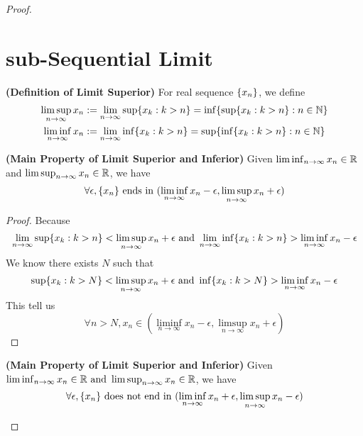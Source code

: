 \documentclass{report}
\begin{document}
\begin{proof}
\section{sub-Sequential Limit}
\begin{definition}
\label{2.3.1}
\textbf{(Definition of Limit Superior)} For real sequence $\{ x_n \}$, we define
\begin{align}
  \limsup_{n\to\infty} x_n&:=\lim_{n\to\infty} \sup \{ x_k:k>n \}=\inf \{ \sup \{ x_k:k>n \}:n\in\mathbb{N} \}\\
  \liminf_{n\to\infty} x_n&:=\lim_{n\to\infty}\inf \{ x_k:k>n \}=\sup \{ \inf \{ x_k:k>n \}:n\in\mathbb{N} \}
\end{align}
\end{definition}
\begin{theorem}
\label{2.3.2}
\textbf{(Main Property of Limit Superior and Inferior)} 
Given $\liminf_{n\to\infty} x_n\in\mathbb{R}$ and $\limsup_{n\to\infty} x_n\in\mathbb{R}$, we have
\begin{gather}
\forall \epsilon ,\{ x_n \}\text{ ends in }(\liminf_{n\to\infty} x_n-\epsilon ,\limsup_{n\to\infty} x_n+\epsilon )
\end{gather}
\end{theorem}
\begin{proof}
Because 
\begin{equation}
\lim_{n\to\infty}\sup  \{ x_k:k>n \}<\limsup_{n\to\infty} x_n+\epsilon \text{ and }\lim_{n\to\infty}\inf \{ x_k:k>n \}>\liminf_{n\to\infty} x_n-\epsilon 
\end{equation}
We know there exists $N$ such that 
 \begin{equation}
\sup \{ x_k:k>N \}<\limsup_{n\to\infty} x_n+\epsilon \text{ and }\inf \{ x_k:k>N \}>\liminf_{n\to\infty} x_n-\epsilon 
\end{equation}
This tell us
\begin{equation}
\forall n>N, x_n\in (\liminf_{n\to\infty} x_n-\epsilon ,\limsup_{n\to\infty} x_n+\epsilon )
\end{equation}
\end{proof}
\begin{theorem}
\label{2.3.3}
\textbf{(Main Property of Limit Superior and Inferior)} 
Given $\liminf_{n\to\infty} x_n\in\mathbb{R}\text{ and }\limsup_{n\to\infty} x_n\in\mathbb{R}$, we have
\begin{equation}
\forall \epsilon , \set{x_n}\text{ does not end in }(\liminf_{n\to\infty} x_n+\epsilon ,\limsup_{n\to\infty} x_n-\epsilon )

\end{equation}
\end{theorem}
\end{proof}
\end{document}
